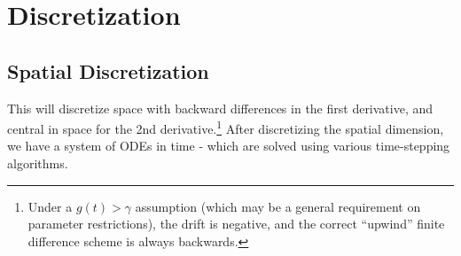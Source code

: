 \documentclass[11pt]{article}
\begin{document}
\newpage
\appendix
\makeatletter
\def\@seccntformat#1{Appendix\ \csname the#1\endcsname\quad}
\makeatother
\makeatletter
\def\@seccntformat#1{\csname Pref@#1\endcsname \csname the#1\endcsname\quad}
\def\Pref@section{Appendix~}
\makeatother
{}

\section{Discretization}
\subsection{Spatial Discretization}\label{sec:discretization}
This will discretize space with backward differences in the first derivative, and central in space for the 2nd derivative.\footnote{Under a $g(t) > \gamma$ assumption (which may be a general requirement on parameter restrictions), the drift is negative, and the correct ``upwind'' finite difference scheme is always backwards.}  After discretizing the spatial dimension, we have a system of ODEs in time - which are solved using various time-stepping algorithms.
\end{document}
